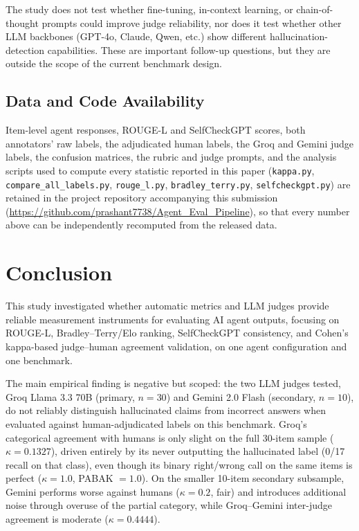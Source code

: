 \documentclass[conference]{IEEEtran}
\begin{document}
The study does not test whether fine-tuning, in-context learning, or chain-of-thought prompts could improve judge reliability, nor does it test whether other LLM backbones (GPT-4o, Claude, Qwen, etc.) show different hallucination-detection capabilities. These are important follow-up questions, but they are outside the scope of the current benchmark design.

\subsection{Data and Code Availability}
Item-level agent responses, ROUGE-L and SelfCheckGPT scores, both annotators' raw labels, the adjudicated human labels, the Groq and Gemini judge labels, the confusion matrices, the rubric and judge prompts, and the analysis scripts used to compute every statistic reported in this paper (\texttt{kappa.py}, \texttt{compare\_all\_labels.py}, \texttt{rouge\_l.py}, \texttt{bradley\_terry.py}, \texttt{selfcheckgpt.py}) are retained in the project repository accompanying this submission (\url{https://github.com/prashant7738/Agent_Eval_Pipeline}), so that every number above can be independently recomputed from the released data.

\section{Conclusion}

This study investigated whether automatic metrics and LLM judges provide reliable measurement instruments for evaluating AI agent outputs, focusing on ROUGE-L, Bradley--Terry/Elo ranking, SelfCheckGPT consistency, and Cohen's kappa-based judge--human agreement validation, on one agent configuration and one benchmark.

The main empirical finding is negative but scoped: the two LLM judges tested, Groq Llama 3.3 70B (primary, $n=30$) and Gemini 2.0 Flash (secondary, $n=10$), do not reliably distinguish hallucinated claims from incorrect answers when evaluated against human-adjudicated labels on this benchmark. Groq's categorical agreement with humans is only slight on the full 30-item sample ($\kappa=0.1327$), driven entirely by its never outputting the hallucinated label (0/17 recall on that class), even though its binary right/wrong call on the same items is perfect ($\kappa=1.0$, PABAK $=1.0$). On the smaller 10-item secondary subsample, Gemini performs worse against humans ($\kappa=0.2$, fair) and introduces additional noise through overuse of the partial category, while Groq--Gemini inter-judge agreement is moderate ($\kappa=0.4444$).
\end{document}
